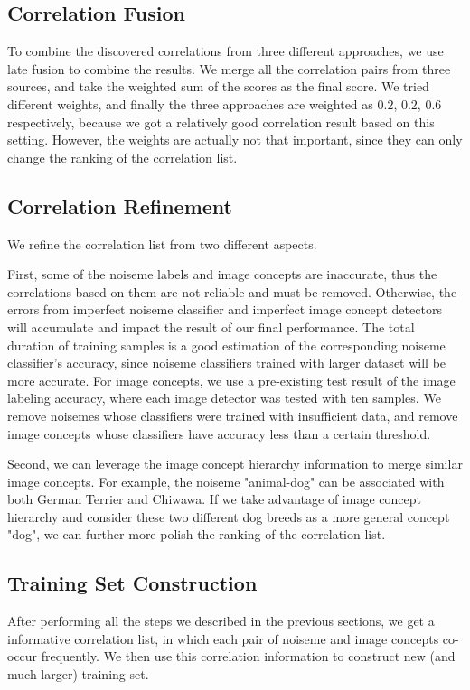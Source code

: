 \documentclass[conference, 11pt, onecolumn]{IEEEtran}
\begin{document}
\subsection{Correlation Fusion}
To combine the discovered correlations from three different approaches, we use late fusion to combine the results. We merge all the correlation pairs from three sources, and take the weighted sum of the scores as the final score. We tried different weights, and finally the three approaches are weighted as $0.2$, $0.2$, $0.6$ respectively, because we got a relatively good correlation result based on this setting. However, the weights are actually not that important, since they can only change the ranking of the correlation list.

\subsection{Correlation Refinement}
We refine the correlation list from two different aspects.

First, some of the noiseme labels and image concepts are inaccurate, thus the correlations based on them are not reliable and must be removed. Otherwise, the errors from imperfect noiseme classifier and imperfect image concept detectors will accumulate and impact the result of our final performance. The total duration of training samples is a good estimation of the corresponding noiseme classifier's accuracy, since noiseme classifiers trained with larger dataset will be more accurate. For image concepts, we use a pre-existing test result of the image labeling accuracy, where each image detector was tested with ten samples. We remove noisemes whose classifiers were trained with insufficient data, and remove image concepts whose classifiers have accuracy less than a certain threshold.

Second, we can leverage the image concept hierarchy information to merge similar image concepts. For example, the noiseme "animal-dog" can be associated with both German Terrier and Chiwawa. If we take advantage of image concept hierarchy and consider these two different dog breeds as a more general concept "dog", we can further more polish the ranking of the correlation list.

\subsection{Training Set Construction}
After performing all the steps we described in the previous sections, we get a informative correlation list, in which each pair of noiseme and image concepts co-occur frequently. We then use this correlation information to construct new (and much larger) training set.
\end{document}

